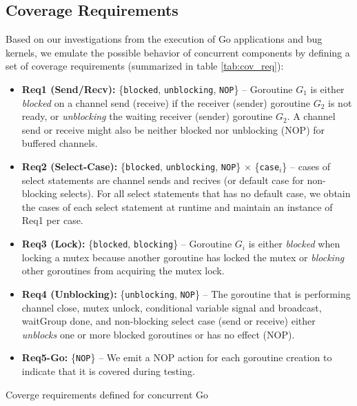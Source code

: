 \subsection{Coverage Requirements}
\label{sec:covreq}
Based on our investigations from the execution of Go applications and bug kernels, we emulate the possible behavior of concurrent components by defining a set of coverage requirements (summarized in table \ref{tab:cov_req}):
%
\begin{itemize}
  \item \textbf{Req1 (Send/Recv):} \{\texttt{blocked}, \texttt{unblocking}, \texttt{NOP}\} -- Goroutine $G_1$ is either \textit{blocked} on a channel send (receive) if the receiver (sender) goroutine $G_2$ is not ready, or \textit{unblocking} the waiting receiver (sender) goroutine $G_2$. A channel send or receive might also be neither blocked nor unblocking (NOP) for buffered channels.
  \item \textbf{Req2 (Select-Case):} \{\texttt{blocked}, \texttt{unblocking}, \texttt{NOP}\} $\times$ \{\texttt{case}$_i$\} -- cases of select statements are channel sends and recives (or default case for non-blocking selects). For all select statements that has no default case, we obtain the cases of each select statement at runtime and maintain an instance of Req1 per case.
  \item \textbf{Req3 (Lock):} \{\texttt{blocked}, \texttt{blocking}\} -- Goroutine $G_i$ is either \textit{blocked} when locking a mutex because another goroutine has locked the mutex or \textit{blocking} other goroutines from acquiring the mutex lock.
  \item \textbf{Req4 (Unblocking):} \{\texttt{unblocking}, \texttt{NOP}\} -- The goroutine that is performing channel close, mutex unlock, conditional variable signal and broadcast, waitGroup done, and non-blocking select case (send or receive) either \textit{unblocks} one or more blocked goroutines or has no effect (NOP).
  \item \textbf{Req5-Go:} \{\texttt{NOP}\} -- We emit a NOP action for each goroutine creation to indicate that it is covered during testing.
\end{itemize}


\begin{table}[]
\centering
\caption{Coverge requirements defined for concurrent Go}
\scalebox{0.83}{

}
\label{tab:cov_req}
\end{table}

